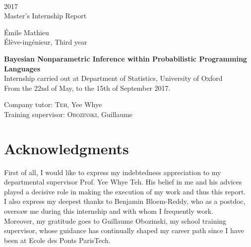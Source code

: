 \documentclass[twoside,10pt,openany,a4paper]{rapport}
\begin{document}
\begin{titlepage}
\begin{center}
      \vspace{0.3cm}
      \\
      
      \vspace{0.7cm}
      2017\\
      Master's Internship Report
      
      \vspace{0.3cm}
      Émile Mathieu\\
      Élève-ingénieur, Third year
      
      \vspace{2cm}
      \Huge{\textbf{Bayesian Nonparametric Inference within Probabilistic Programming Languages}}\\

      \vfill
      \normalsize{}
      Internship carried out at Department of Statistics, University of Oxford \\
      From the 22nd of May, to the 15th of September 2017.
      
      \vspace{0.3cm}
       Company tutor: \textsc{Teh}, Yee Whye\\
       Training supervisor: \textsc{Obozinski}, Guillaume

      \end{center}
\end{titlepage}

\cleardoublepage


\chapter{Acknowledgments}

First of all, I would like to express my indebtedness appreciation to my departmental supervisor Prof. Yee Whye Teh. His belief in me and his advices played a decisive role in making the execution of my work and thus this report. \\

I also express my deepest thanks to Benjamin Bloem-Reddy, who as a postdoc, oversaw me during this internship and with whom I frequently work. \\

Moreover, my gratitude goes to Guillaume Obozinski, my school training supervisor, whose guidance has continually shaped my career path since I have been at Ecole des Ponts ParisTech.
\end{document}
